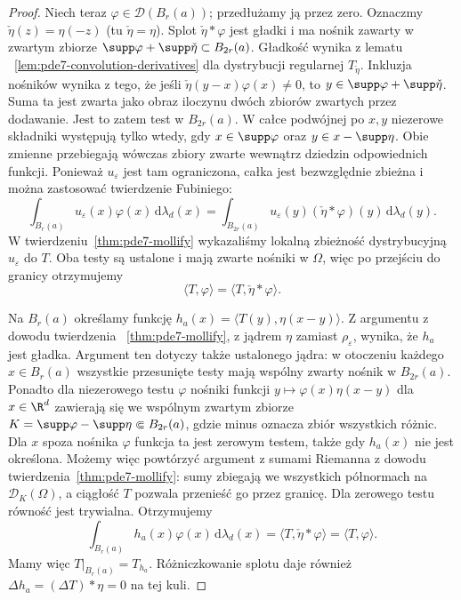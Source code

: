 \begin{proof}
Niech teraz $\varphi\in\mathcal D(B_r(a))$;
przedłużamy ją przez zero. Oznaczmy
$\check\eta(z)=\eta(-z)$ (tu $\check\eta=\eta$).
Splot $\check\eta*\varphi$ jest gładki
i ma nośnik zawarty w zwartym zbiorze
$\supp\varphi+\supp\check\eta\subset B_{2r}(a)$.
Gładkość wynika z lematu
~\ref{lem:pde7-convolution-derivatives}
dla dystrybucji regularnej $T_{\check\eta}$.
Inkluzja nośników wynika z tego, że jeśli
$\check\eta(y-x)\varphi(x)\ne0$, to
$y\in\supp\varphi+\supp\check\eta$.
Suma ta jest zwarta jako obraz iloczynu
dwóch zbiorów zwartych przez dodawanie.
Jest to zatem test w $B_{2r}(a)$.
W całce podwójnej po $x,y$ niezerowe składniki
występują tylko wtedy, gdy $x\in\supp\varphi$
oraz $y\in x-\supp\eta$. Obie zmienne przebiegają
wówczas zbiory zwarte wewnątrz dziedzin
odpowiednich funkcji. Ponieważ $u_\varepsilon$
jest tam ograniczona, całka jest bezwzględnie
zbieżna i można zastosować twierdzenie Fubiniego:
\[
 \int_{B_r(a)}u_\varepsilon(x)\varphi(x)\,
 \mathrm d\lambda_d(x)
 =\int_{B_{2r}(a)}u_\varepsilon(y)
 (\check\eta*\varphi)(y)\,\mathrm d\lambda_d(y).
\]
W twierdzeniu~\ref{thm:pde7-mollify} wykazaliśmy
lokalną zbieżność dystrybucyjną $u_\varepsilon$ do $T$.
Oba testy są ustalone i mają zwarte nośniki
w $\Omega$, więc po przejściu do granicy otrzymujemy
\[
 \langle T,\varphi\rangle
 =\langle T,\check\eta*\varphi\rangle.
\]

Na $B_r(a)$ określamy funkcję
$h_a(x)=\langle T(y),\eta(x-y)\rangle$.
Z argumentu z dowodu twierdzenia
~\ref{thm:pde7-mollify}, z jądrem $\eta$ zamiast
$\rho_\varepsilon$, wynika, że $h_a$ jest gładka.
Argument ten dotyczy także ustalonego jądra:
w otoczeniu każdego $x\in B_r(a)$ wszystkie
przesunięte testy mają wspólny zwarty nośnik
w $B_{2r}(a)$.
Ponadto dla niezerowego testu $\varphi$ nośniki
funkcji $y\mapsto\varphi(x)\eta(x-y)$ dla
$x\in\R^d$ zawierają się we wspólnym zwartym zbiorze
$K=\supp\varphi-\supp\eta\Subset B_{2r}(a)$,
gdzie minus oznacza zbiór wszystkich różnic.
Dla $x$ spoza nośnika $\varphi$ funkcja ta jest
zerowym testem, także gdy $h_a(x)$ nie jest określona.
Możemy więc powtórzyć argument z sumami Riemanna
z dowodu twierdzenia~\ref{thm:pde7-mollify}:
sumy zbiegają we wszystkich półnormach na
$\mathcal D_K(\Omega)$, a ciągłość $T$ pozwala
przenieść go przez granicę. Dla zerowego testu
równość jest trywialna. Otrzymujemy
\[
 \int_{B_r(a)}h_a(x)\varphi(x)\,\mathrm d\lambda_d(x)
 =\langle T,\check\eta*\varphi\rangle
 =\langle T,\varphi\rangle.
\]
Mamy więc $T|_{B_r(a)}=T_{h_a}$.
Różniczkowanie splotu daje również
$\Delta h_a=(\Delta T)*\eta=0$ na tej kuli.


\end{proof}
